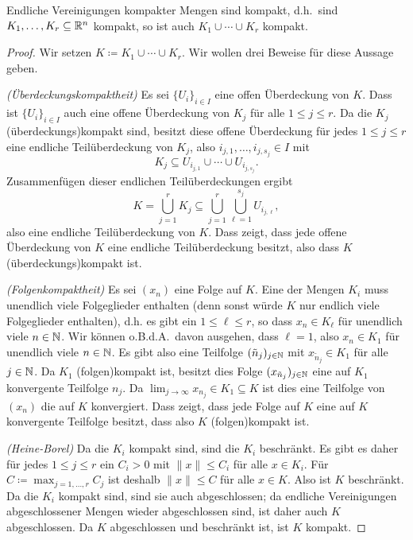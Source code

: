 \documentclass[a4paper,10pt]{article}
\begin{document}
\begin{lem}
 Endliche Vereinigungen kompakter Mengen sind kompakt, d.h.\ sind $K_1, \dotsc, K_r \subseteq \mathbb{R}^n$ kompakt, so ist auch $K_1 \cup \dotsb \cup K_r$ kompakt.
\end{lem}
\begin{proof}
 Wir setzen $K \coloneqq K_1 \cup \dotsb \cup K_r$. Wir wollen drei Beweise für diese Aussage geben.
 
 \emph{(Überdeckungskompaktheit)} Es sei $\{U_i\}_{i \in I}$ eine offen Überdeckung von $K$. Dass ist $\{U_i\}_{i \in I}$ auch eine offene Überdeckung von $K_j$ für alle $1 \leq j \leq r$. Da die $K_j$ (überdeckungs)kompakt sind, besitzt diese offene Überdeckung für jedes $1 \leq j \leq r$ eine endliche Teilüberdeckung von $K_j$, also $i_{j,1}, \dotsc, i_{j,s_j} \in I$ mit
 \[
  K_j \subseteq U_{i_{j,1}} \cup \dotsb \cup U_{i_{j,s_j}}.
 \]
 Zusammenfügen dieser endlichen Teilüberdeckungen ergibt
 \[
  K
  = \bigcup_{j=1}^r K_j
  \subseteq \bigcup_{j=1}^r \bigcup_{\ell=1}^{s_j} U_{i_{j,\ell}},
 \]
 also eine endliche Teilüberdeckung von $K$. Dass zeigt, dass jede offene Überdeckung von $K$ eine endliche Teilüberdeckung besitzt, also dass $K$ (über\-deck\-ungs)kom\-pakt ist.
 
 \emph{(Folgenkompaktheit)} Es sei $(x_n)$ eine Folge auf $K$. Eine der Mengen $K_i$ muss unendlich viele Folgeglieder enthalten (denn sonst würde $K$ nur endlich viele Folgeglieder enthalten), d.h. es gibt ein $1 \leq \ell \leq r$, so dass $x_n \in K_\ell$ für unendlich viele $n \in \mathbb{N}$. Wir können o.B.d.A.\ davon ausgehen, dass $\ell = 1$, also $x_n \in K_1$ für unendlich viele $n \in \mathbb{N}$. Es gibt also eine Teilfolge $(\tilde{n}_j)_{j \in \mathbb{N}}$ mit $x_{\tilde{n}_j} \in K_1$ für alle $j \in \mathbb{N}$. Da $K_1$ (folgen)kompakt ist, besitzt dies Folge $(x_{\tilde{n}_j})_{j \in \mathbb{N}}$ eine auf $K_1$ konvergente Teilfolge $n_j$. Da $\lim_{j \to \infty} x_{n_j} \in K_1 \subseteq K$ ist dies eine Teilfolge von $(x_n)$ die auf $K$ konvergiert. Dass zeigt, dass jede Folge auf $K$ eine auf $K$ konvergente Teilfolge besitzt, dass also $K$ (folgen)kompakt ist.
 
 \emph{(Heine-Borel)} Da die $K_i$ kompakt sind, sind die $K_i$ beschränkt. Es gibt es daher für jedes $1 \leq j \leq r$ ein $C_i > 0$ mit $\|x\| \leq C_i$ für alle $x \in K_i$. Für $C \coloneqq \max_{j=1,\dotsc,r} C_j$ ist deshalb $\|x\| \leq C$ für alle $x \in K$. Also ist $K$ beschränkt. Da die $K_i$ kompakt sind, sind sie auch abgeschlossen; da endliche Vereinigungen abgeschlossener Mengen wieder abgeschlossen sind, ist daher auch $K$ abgeschlossen. Da $K$ abgeschlossen und beschränkt ist, ist $K$ kompakt.
\end{proof}
\end{document}
